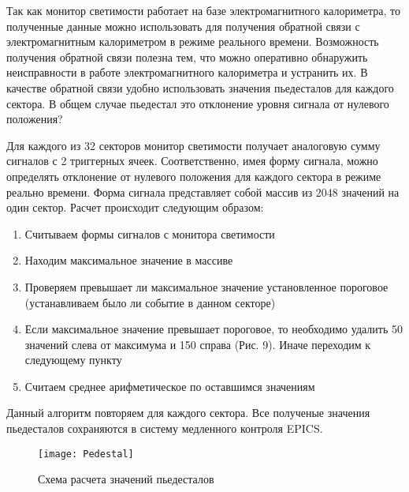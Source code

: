   Так как монитор светимости работает на базе электромагнитного калориметра, то полученные данные можно использовать для получения обратной связи с электромагнитным калориметром в режиме реального времени. Возможность получения обратной связи полезна тем, что можно оперативно обнаружить неисправности в работе электромагнитного калориметра и устранить их. В качестве обратной связи удобно использовать значения пьедесталов для каждого сектора. В общем случае пьедестал это отклонение уровня сигнала от нулевого положения?\par
  Для каждого из 32 секторов монитор светимости получает аналоговую сумму сигналов с 2 триггерных ячеек. Соответственно, имея форму сигнала, можно определять отклонение от нулевого положения для каждого сектора в режиме реально времени. Форма сигнала представляет собой массив из 2048 значений на один сектор. Расчет происходит следующим образом:
\begin{enumerate}
  \item Считываем формы сигналов с монитора светимости
  \item Находим максимальное значение в массиве
  \item Проверяем превышает ли максимальное значение установленное пороговое (устанавливаем было ли событие в данном секторе)
  \item Если максимальное значение превышает пороговое, то необходимо удалить 50 значений слева от максимума и 150 справа (Рис. 9). Иначе переходим к следующему пункту
  \item Считаем среднее арифметическое по оставшимся значениям
\end{enumerate}
Данный алгоритм повторяем для каждого сектора. Все полученые значения пьедесталов сохраняются в систему медленного контроля EPICS.
\begin{figure}[htp]
  \centering
  \texttt{[image: Pedestal]}
  \caption{Схема расчета значений пьедесталов}
  \label{fig:galaxy}
\end{figure}
